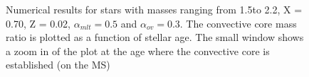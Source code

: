 \begin{figure}[htbp]
    \centering
    \caption{Numerical results for stars with masses ranging from 1.5\msun to 2.2\msun, X = 0.70, Z = 0.02, $\alpha_{mlt} = 0.5$ and $\alpha_{ov} = 0.3$. The convective core mass ratio is plotted as a function of stellar age. The small window shows a zoom in of the plot at the age where the convective core is established (on the MS)}
    \label{convcore}
\end{figure}






